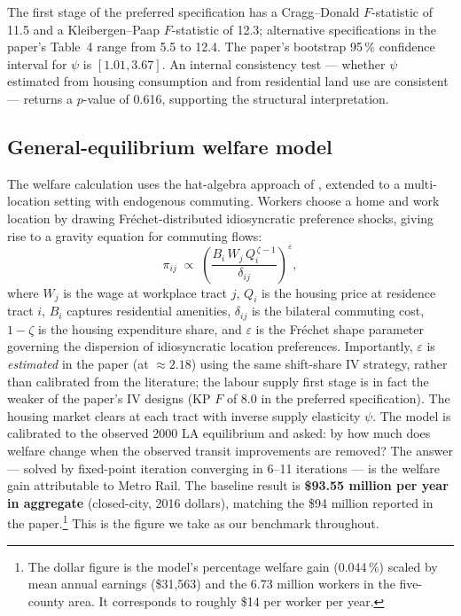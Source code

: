 \documentclass[12pt,a4paper]{article}
\begin{document}
The first stage of the preferred specification has a Cragg--Donald $F$-statistic
of 11.5 and a Kleibergen--Paap $F$-statistic of 12.3; alternative specifications
in the paper's Table~4 range from 5.5 to 12.4.  The paper's bootstrap 95\,\%
confidence interval for $\psi$ is $[1.01, 3.67]$.  An internal consistency test
--- whether $\psi$ estimated from housing consumption and from residential land
use are consistent --- returns a $p$-value of 0.616, supporting the structural
interpretation.

\subsection{General-equilibrium welfare model}

The welfare calculation uses the hat-algebra approach of
\citet{dekle2008global}, extended to a multi-location setting with endogenous
commuting.  Workers choose a home and work location by drawing Fréchet-distributed
idiosyncratic preference shocks, giving rise to a gravity equation for commuting
flows:
%
\begin{equation}
  \pi_{ij} \;\propto\;
  \left(\frac{B_i\,W_j\,Q_i^{\,\zeta-1}}{\delta_{ij}}\right)^{\!\varepsilon},
  \label{eq:gravity}
\end{equation}
%
where $W_j$ is the wage at workplace tract $j$, $Q_i$ is the housing price at
residence tract $i$, $B_i$ captures residential amenities, $\delta_{ij}$ is the
bilateral commuting cost, $1-\zeta$ is the housing expenditure share, and
$\varepsilon$ is the Fréchet shape parameter governing the dispersion of
idiosyncratic location preferences.  Importantly, $\varepsilon$ is
\emph{estimated} in the paper (at $\approx 2.18$) using the same shift-share IV
strategy, rather than calibrated from the literature; the labour supply
first stage is in fact the weaker of the paper's IV designs (KP $F$ of 8.0
in the preferred specification).  The housing market clears at each tract with
inverse supply elasticity $\psi$.  The model is calibrated to the observed 2000
LA equilibrium and asked: by how much does welfare change when the observed
transit improvements are removed?  The answer --- solved by fixed-point
iteration converging in 6--11 iterations --- is the welfare gain attributable to
Metro Rail.  The baseline result is \textbf{\$93.55 million per year in
aggregate} (closed-city, 2016 dollars), matching the \$94 million reported in
the paper.\footnote{The dollar figure is the model's percentage welfare gain
(0.044\,\%) scaled by mean annual earnings (\$31{,}563) and the 6.73 million
workers in the five-county area.  It corresponds to roughly \$14 per worker per
year.}  This is the figure we take as our benchmark throughout.
\end{document}
